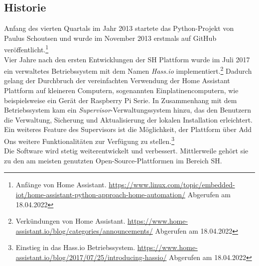     \subsection*{Historie}
    \label{sec:historyHOAS}
        Anfang des vierten Quartals im Jahr 2013 startete das Python-Projekt von Paulus Schoutsen und wurde im November 2013 erstmals auf GitHub 
        veröffentlicht.\footnote{Anfänge von Home Assistant. \url{https://www.linux.com/topic/embedded-iot/home-assistant-python-approach-home-automation/} Abgerufen am 18.04.2022}
        \\
        \linebreak
        Vier Jahre nach den ersten Entwicklungen der \acl{SH} Plattform wurde im Juli 2017 ein verwaltetes Betriebssystem mit dem Namen 
        \textit{Hass.io} implementiert.\footnote{Verkündungen von Home Assistant. \url{https://www.home-assistant.io/blog/categories/announcements/} Abgerufen am 18.04.2022} 
        Dadurch gelang der Durchbruch der vereinfachten Verwendung der Home Assistant Plattform auf kleineren Computern, sogenannten 
        Einplatinencomputern, wie beispielsweise ein Gerät der Raspberry Pi Serie. In Zusammenhang mit dem Betriebssystem kam ein 
        \textit{Supervisor}-Verwaltungssystem hinzu, das den Benutzern die Verwaltung, Sicherung und Aktualisierung der lokalen Installation 
        erleichtert. Ein weiteres Feature des Supervisors ist die Möglichkeit, der Plattform über Add Ons weitere Funktionalitäten zur Verfügung zu 
        stellen.\footnote{Einstieg in das Hass.io Betriebssystem. \url{https://www.home-assistant.io/blog/2017/07/25/introducing-hassio/} Abgerufen am 18.04.2022}
        \\
        \linebreak
        Die Software wird stetig weiterentwickelt und verbessert. Mittlerweile gehört sie zu den am meisten genutzten Open-Source-Plattformen 
        im Bereich \acl{SH}.

